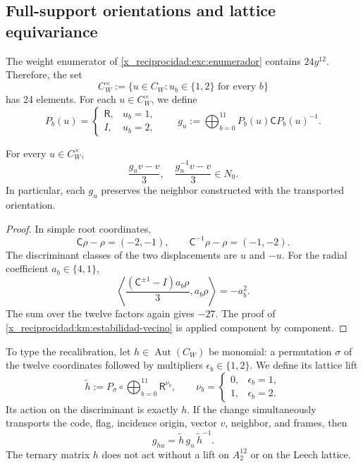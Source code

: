 \subsection{Full-support orientations and lattice equivariance}
\label{x_reciprocidad:paper:24-orientaciones}

The weight enumerator of \eqref{x_reciprocidad:exc:enumerador} contains
\(24y^{12}\). Therefore, the set
\[
 C_W^\times:=
 \{u\in C_W:u_b\in\{1,2\}\text{ for every }b\}
\]
has 24 elements. For each \(u\in C_W^\times\), we define
\[
 P_b(u)=
 \begin{cases}
  \mathsf R,&u_b=1,\\
  I,&u_b=2,
 \end{cases}
 \qquad
 g_u:=\bigoplus_{b=0}^{11}P_b(u)\mathsf C P_b(u)^{-1}.
\]

\begin{proposition}
\label{x_reciprocidad:paper:robustez-orientaciones}
For every \(u\in C_W^\times\),
\[
 \frac{g_uv-v}{3},
 \quad
 \frac{g_u^{-1}v-v}{3}
 \in N_0.
\]
In particular, each \(g_u\) preserves the neighbor constructed with the
transported orientation.
\end{proposition}

\begin{proof}
In simple root coordinates,
\[
 \mathsf C\rho-\rho=(-2,-1),
 \qquad
 \mathsf C^{-1}\rho-\rho=(-1,-2).
\]
The discriminant classes of the two displacements are \(u\) and \(-u\).
For the radial coefficient \(a_b\in\{4,1\}\),
\[
 \left\langle
 \frac{(\mathsf C^{\pm1}-I)a_b\rho}{3},a_b\rho
 \right\rangle=-a_b^2.
\]
The sum over the twelve factors again gives \(-27\). The proof of
\cref{x_reciprocidad:km:estabilidad-vecino} is applied component by
component.
\end{proof}

To type the recalibration, let
\(h\in\operatorname{Aut}(C_W)\) be monomial: a permutation \(\sigma\) of
the twelve coordinates followed by multipliers
\(\epsilon_b\in\{1,2\}\). We define its lattice lift
\begin{equation}
 \widetilde h
 :=P_\sigma\circ
 \bigoplus_{b=0}^{11}\mathsf R^{\nu_b},
 \qquad
 \nu_b=
 \begin{cases}
 0,&\epsilon_b=1,\\
 1,&\epsilon_b=2.
 \end{cases}
 \label{x_reciprocidad:paper:elevacion-monomial}
\end{equation}
Its action on the discriminant is exactly \(h\). If the change simultaneously
transports the code, flag, incidence origin, vector \(v\), neighbor, and
frames, then
\begin{equation}
 g_{hu}=\widetilde h\,g_u\,\widetilde h^{-1}.
 \label{x_reciprocidad:paper:naturalidad-isometrias}
\end{equation}
The ternary matrix \(h\) does not act without a lift on \(A_2^{12}\) or on
the Leech lattice.

